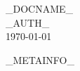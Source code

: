 \documentclass[a4paper,12pt]{article}
\newcommand{\auth}{_AUTH_}
\newcommand{\docname}{_DOCNAME_}
\begin{document}
\begin{titlepage}
\vspace*{5cm}
\begin{center}
{\Huge \docname}\\[1cm]
{\Large \auth}\\[1cm]
{\today}
\end{center}
\end{titlepage}

\newpage

\pagestyle{plain}
_METAINFO_
\tableofcontents
\pagestyle{plain}
\newpage


\newpage
\pagestyle{fancy}
\listoftables
\listoffigures
\lstlistoflistings
\printindex
\end{document}
